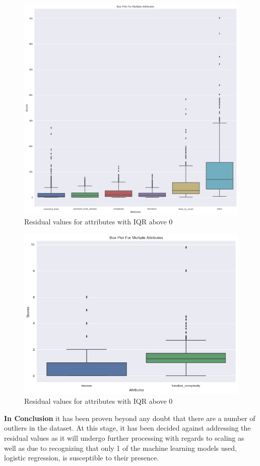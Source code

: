\begin{figure}[!h]
    \centering
    \includegraphics[scale=0.45]{Figures/boxplot_iqr_above_0_part1.png}
    \caption{Residual values for attributes with IQR above 0}
    \label{fig:outliers:boxplot-iqr-above-0-part1}
\end{figure}

\begin{figure}[!h]
    \centering
    \includegraphics[scale=0.65]{Figures/boxplot_iqr_above_0_part2.png}
    \caption{Residual values for attributes with IQR above 0}
    \label{fig:outliers:boxplot-iqr-above-0-part2}
\end{figure}

\textbf{In Conclusion} it has been proven beyond any doubt that there are a number of outliers in the dataset. At this stage, it has been decided against addressing the residual values as it will undergo further processing with regards to scaling as well as due to recognizing that only 1 of the machine learning models used, logistic regression, is susceptible to their presence. 
\FloatBarrier